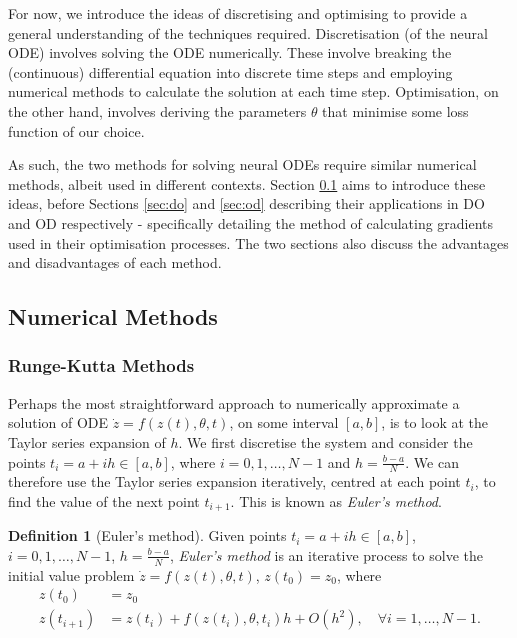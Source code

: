 \documentclass[a4paper,11pt,titlepage]{article}
\theoremstyle{definition}
\newtheorem{definition}{Definition}[section]
\theoremstyle{plain}
\theoremstyle{remark}
\begin{document}
For now, we introduce the ideas of discretising and optimising to provide a general understanding of the techniques required. Discretisation (of the neural ODE) involves solving the ODE numerically. These involve breaking the (continuous) differential equation into discrete time steps and employing numerical methods to calculate the solution at each time step. Optimisation, on the other hand, involves deriving the parameters $\theta$ that minimise some loss function of our choice. 

As such, the two methods for solving neural ODEs require similar numerical methods, albeit used in different contexts. Section \ref{sec:nummethods} aims to introduce these ideas, before Sections \ref{sec:do} and \ref{sec:od} describing their applications in DO and OD respectively - specifically detailing the method of calculating gradients used in their optimisation processes. The two sections also discuss the advantages and disadvantages of each method.

\subsection{Numerical Methods}
\label{sec:nummethods}

\subsubsection{Runge-Kutta Methods}
\label{sec:rungekutta}
Perhaps the most straightforward approach to numerically approximate a solution of ODE $\dot{z}= f(z(t), \theta,t)$, on some interval $\left[a, b\right]$, is to look at the Taylor series expansion of $h$. We first discretise the system and consider the points $t_i = a + ih \in \left[a, b\right]$, where $i = 0, 1, \dots, N - 1$ and $h = \frac{b-a}{N}$. We can therefore use the Taylor series expansion iteratively, centred at each point $t_i$, to find the value of the next point $t_{i + 1}$. This is known as \textit{Euler's method}.

\begin{definition}[Euler's method]
    Given points $t_i = a + ih \in \left[a, b\right]$, $i = 0, 1, \dots, N - 1$, $h = \frac{b-a}{N}$, \textit{Euler's method} is an iterative process to solve the initial value problem $\dot{z}= f(z(t), \theta,t)$, $z(t_0) = z_0$, where
    \begin{align*}
        z(t_0) &= z_0 \\
        z(t_{i+1}) &= z(t_i) + f(z(t_{i}), \theta, t_i)h + O(h^2),\quad\forall i = 1, \dots, N - 1.
    \end{align*}
\end{definition}
\end{document}
